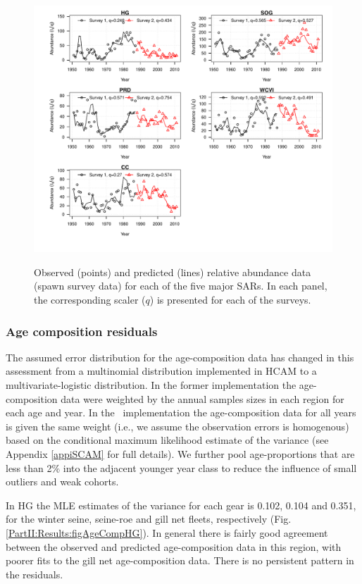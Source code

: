 \begin{figure}[!tbp]
	\includegraphics[width=\textwidth]{../FIGS/qPriorFigs/iscam_fig_surveyfit.pdf}\\
	\caption{Observed (points) and predicted (lines) relative abundance data (spawn survey data) for each of the five major SARs.  In each panel, the corresponding scaler ($q$) is presented for each of the surveys.}\label{PartII:Results:fig3}
\end{figure}


\subsubsection{Age composition residuals}

The assumed error distribution for the age-composition data has changed in this assessment from a multinomial distribution implemented in HCAM to a multivariate-logistic distribution. In the former implementation the age-composition data were weighted by the annual samples sizes in each region for each age and year. In the \iscam\ implementation the age-composition data for all years is given the same weight (i.e., we assume the observation errors is homogenous) based on the conditional maximum likelihood estimate of the variance (see Appendix \ref{appiSCAM} for full details).  We further pool age-proportions that are less than 2\% into the adjacent younger year class to reduce the influence of small outliers and weak cohorts.

In HG the MLE estimates of the variance for each gear is 0.102, 0.104 and 0.351, for the winter seine, seine-roe and gill net fleets, respectively (Fig. \ref{PartII:Results:figAgeCompHG}).  In general there is fairly good agreement between the observed and predicted age-composition data in this region, with poorer fits to the gill net age-composition data.  There is no persistent pattern in the residuals. 


